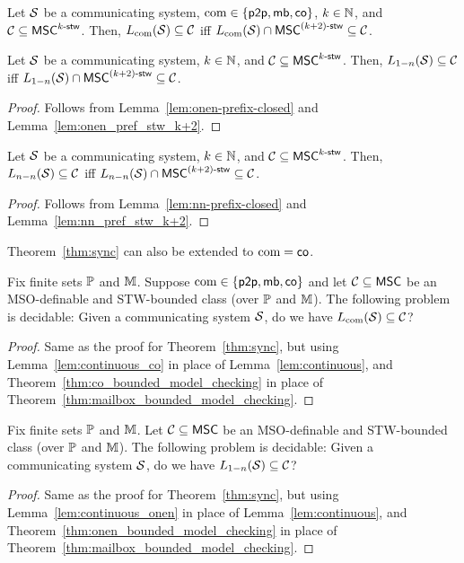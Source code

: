 \documentclass{article}
\begin{document}
\begin{lemma}\label{lem:continuous_co}
Let $\mathcal{S}$ be a communicating system, $\textup{com} \in \{\mathsf{p2p}, \mathsf{mb}, \mathsf{co}\}$,
$k \in \mathbb{N}$, and $\mathcal{C} \subseteq \mathsf{MSC}^{k\textup{-}\mathsf{stw}}$.
Then, $L_{\textup{com}}(\mathcal{S}) \subseteq \mathcal{C}$ iff
$L_{\textup{com}}(\mathcal{S}) \cap \mathsf{MSC}^{(k+2)\textup{-}\mathsf{stw}} \subseteq \mathcal{C}$.
\end{lemma}

\begin{lemma}\label{lem:continuous_onen}
Let $\mathcal{S}$ be a communicating system,
$k \in \mathbb{N}$, and $\mathcal{C} \subseteq \mathsf{MSC}^{k\textup{-}\mathsf{stw}}$.
Then, $L_{1\mathsf{-}n}(\mathcal{S}) \subseteq \mathcal{C}$ iff
$L_{1\mathsf{-}n}(\mathcal{S}) \cap \mathsf{MSC}^{(k+2)\textup{-}\mathsf{stw}} \subseteq \mathcal{C}$.
\end{lemma}
\begin{proof}
	Follows from Lemma~\ref{lem:onen-prefix-closed} and Lemma~\ref{lem:onen_pref_stw_k+2}.
\end{proof}

\begin{lemma}\label{lem:continuous_nn}
Let $\mathcal{S}$ be a communicating system,
$k \in \mathbb{N}$, and $\mathcal{C} \subseteq \mathsf{MSC}^{k\textup{-}\mathsf{stw}}$.
Then, $L_{n\mathsf{-}n}(\mathcal{S}) \subseteq \mathcal{C}$ iff
$L_{n\mathsf{-}n}(\mathcal{S}) \cap \mathsf{MSC}^{(k+2)\textup{-}\mathsf{stw}} \subseteq \mathcal{C}$.
\end{lemma}
\begin{proof}
	Follows from Lemma~\ref{lem:nn-prefix-closed} and Lemma~\ref{lem:nn_pref_stw_k+2}.
\end{proof}

Theorem~\ref{thm:sync} can also be extended to $\textup{com} = \mathsf{co}$.

\begin{theorem}\label{thm:sync_co}
Fix finite sets $\mathbb{P}$ and $\mathbb{M}$.
Suppose $\textup{com} \in \{\mathsf{p2p}, \mathsf{mb},\mathsf{co}\}$ and let $\mathcal{C} \subseteq \mathsf{MSC}$ be an MSO-definable and STW-bounded class (over $\mathbb{P}$ and $\mathbb{M}$).
The following problem is decidable:
Given a communicating system $\mathcal{S}$, do we have $L_{\textup{com}}(\mathcal{S}) \subseteq \mathcal{C}$?
\end{theorem}
\begin{proof}
Same as the proof for Theorem~\ref{thm:sync}, but using Lemma~\ref{lem:continuous_co} in place of Lemma~\ref{lem:continuous}, and Theorem~\ref{thm:co_bounded_model_checking} in place of Theorem~\ref{thm:mailbox_bounded_model_checking}.
\end{proof}

\begin{theorem}\label{thm:sync_onen}
Fix finite sets $\mathbb{P}$ and $\mathbb{M}$.
Let $\mathcal{C} \subseteq \mathsf{MSC}$ be an MSO-definable and STW-bounded class (over $\mathbb{P}$ and $\mathbb{M}$).
The following problem is decidable:
Given a communicating system $\mathcal{S}$, do we have $L_{1\mathsf{-}n}(\mathcal{S}) \subseteq \mathcal{C}$?
\end{theorem}
\begin{proof}
Same as the proof for Theorem~\ref{thm:sync}, but using Lemma~\ref{lem:continuous_onen} in place of Lemma~\ref{lem:continuous}, and Theorem~\ref{thm:onen_bounded_model_checking} in place of Theorem~\ref{thm:mailbox_bounded_model_checking}.
\end{proof}
\end{document}
